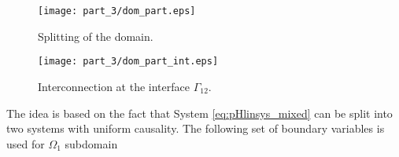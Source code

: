 \begin{figure}[t]
	\begin{minipage}[b]{0.4\linewidth}
		\centering
		\texttt{[image: part\_3/dom\_part.eps]}
		\caption{Splitting of the domain.}
		\label{fig:dom_part}
	\end{minipage}
	\hspace{0.5cm}
	\begin{minipage}[b]{0.55\linewidth}
		\centering
			\texttt{[image: part\_3/dom\_part\_int.eps]}
		\caption{Interconnection at the interface $\Gamma_{12}$.}
		\label{fig:dom_part_int}
	\end{minipage}
\end{figure}


The idea is based on the fact that System \ref{eq:pHlinsys_mixed} can be split into two systems with uniform causality.  The following set of boundary variables is used for $\Omega_1$ subdomain

